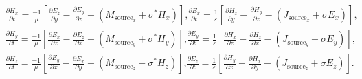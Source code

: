     \begin{align}
        \frac{\partial H_x}{\partial t} = \frac{-1}{\mu}\left[
            \frac{\partial E_z}{\partial y} - \frac{\partial E_y}{\partial z} + (M_{\text{source}_x}+\sigma^* H_x)
            \right]\text{,}
        \frac{\partial E_x}{\partial t} = \frac{1}{\varepsilon}\left[
            \frac{\partial H_z}{\partial y} - \frac{\partial H_y}{\partial z} - (J_{\text{source}_x}+\sigma E_x)
            \right]\text{,}\label{eq:fdtdHx}\\
        \frac{\partial H_y}{\partial t} = \frac{-1}{\mu}\left[
            \frac{\partial E_x}{\partial z} - \frac{\partial E_z}{\partial x} + (M_{\text{source}_y}+\sigma^* H_y)
            \right]\text{,}
        \frac{\partial E_y}{\partial t} = \frac{1}{\varepsilon}\left[
            \frac{\partial H_x}{\partial z} - \frac{\partial H_z}{\partial x} - (J_{\text{source}_y}+\sigma E_y)
            \right]\text{,}\label{eq:fdtdHy}\\
        \frac{\partial H_z}{\partial t} = \frac{-1}{\mu}\left[
            \frac{\partial E_y}{\partial x} - \frac{\partial E_x}{\partial y} + (M_{\text{source}_z}+\sigma^* H_z)
            \right]\text{,}
        \frac{\partial E_z}{\partial t} = \frac{1}{\varepsilon}\left[
            \frac{\partial H_y}{\partial x} - \frac{\partial H_x}{\partial y} - (J_{\text{source}_z}+\sigma E_z)
            \right]\text{.}\label{eq:fdtdHz}
    \end{align}
    
